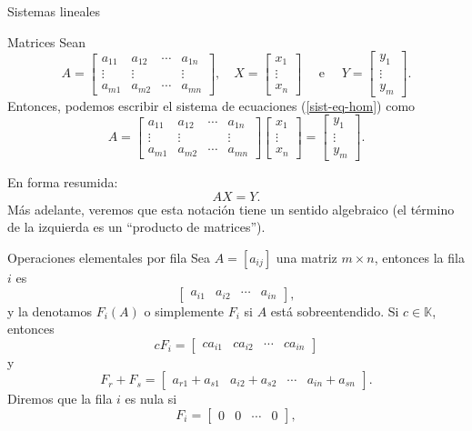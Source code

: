 \documentclass[a4paper,12pt,twoside,spanish]{amsbook}
\theoremstyle{definition}
\theoremstyle{remark}
\newcommand{\K}{\mathbb K}
\begin{document}
\begin{chapter}{Sistemas lineales}
\begin{section}{Matrices}
			Sean
			$$
				A = \begin{bmatrix}
			a_{11}& a_{12}& \cdots &a_{1n} \\
			\vdots&\vdots  &  &\vdots \\
			a_{m1} &a_{m2}&\cdots &a_{mn}
			\end{bmatrix}, \quad 
			X = \begin{bmatrix}
			x_1 \\ \vdots \\ x_n
			\end{bmatrix}\quad \text{ e } \quad
			Y = \begin{bmatrix}
			y_1 \\ \vdots \\ y_m
			\end{bmatrix}.
			$$
			Entonces, podemos escribir el sistema de ecuaciones (\ref*{sist-eq-hom}) como
			\begin{equation}\label{sist-eq-2}
				A = \begin{bmatrix}
				a_{11}& a_{12}& \cdots &a_{1n} \\
				\vdots&\vdots  &  &\vdots \\
				a_{m1} &a_{m2}&\cdots &a_{mn}
				\end{bmatrix}
				\begin{bmatrix}
				x_1  \\ \vdots \\  x_n
				\end{bmatrix} = 
				\begin{bmatrix}
				y_1 \\ \vdots \\ y_m
				\end{bmatrix}.
			\end{equation}
			
			 En forma resumida:
			\begin{equation}\label{sis-eq-hom-2}
			AX = Y.
			\end{equation}
			Más adelante, veremos que esta notación tiene un sentido algebraico (el término de la izquierda es un ``producto de matrices'').
			
			\begin{subsection}{Operaciones elementales por fila}
				Sea $A = [a_{ij}]$ una matriz $m \times  n$,  entonces la fila $i$ es 
				$$
				\begin{bmatrix} a_{i1}& a_{i2}& \cdots &a_{in} 	\end{bmatrix},
				$$
				y la denotamos $F_i(A)$ o simplemente $F_i$ si $A$ está sobreentendido. Si $c\in \K$,  entonces 
				$$
				cF_i = \begin{bmatrix} ca_{i1}& ca_{i2}& \cdots &ca_{in} 	\end{bmatrix}
				$$
				y
				$$
				F_r + F_s = \begin{bmatrix} a_{r1}+a_{s1}& a_{i2}+a_{s2}& \cdots &a_{in}+a_{sn} 	\end{bmatrix}.
				$$ 
				Diremos que la fila $i$ es nula si 
				$$
				F_i = \begin{bmatrix} 0& 0& \cdots &0 	\end{bmatrix},
				$$
				

\end{subsection}
\end{section}
\end{chapter}
\end{document}
